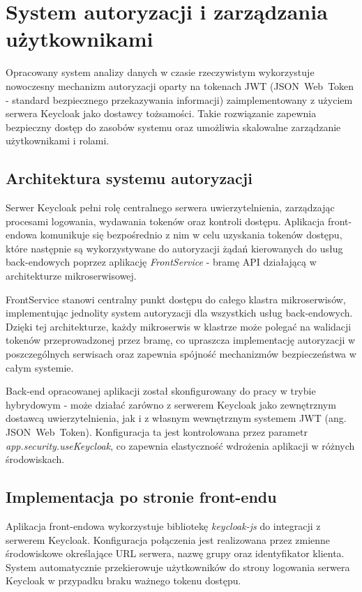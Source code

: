 \section{System autoryzacji i zarządzania użytkownikami}
\label{chap:autoryzacja}

Opracowany system analizy danych w czasie rzeczywistym wykorzystuje nowoczesny mechanizm autoryzacji oparty na tokenach \mbox{JWT} (\mbox{JSON Web Token} - standard bezpiecznego przekazywania informacji) zaimplementowany z użyciem serwera Keycloak jako dostawcy tożsamości. Takie rozwiązanie zapewnia bezpieczny dostęp do zasobów systemu oraz umożliwia skalowalne zarządzanie użytkownikami i rolami.

\subsection{Architektura systemu autoryzacji}

Serwer Keycloak pełni rolę centralnego serwera uwierzytelnienia, zarządzając procesami logowania, wydawania tokenów oraz kontroli dostępu. Aplikacja front-endowa komunikuje się bezpośrednio z nim w celu uzyskania tokenów dostępu, które następnie są wykorzystywane do autoryzacji żądań kierowanych do usług back-endowych poprzez aplikację \textit{FrontService} - bramę API działającą w architekturze mikroserwisowej.

FrontService stanowi centralny punkt dostępu do całego klastra mikroserwisów, implementując jednolity system autoryzacji dla wszystkich usług back-endowych. Dzięki tej architekturze, każdy mikroserwis w klastrze może polegać na walidacji tokenów przeprowadzonej przez bramę, co upraszcza implementację autoryzacji w poszczególnych serwisach oraz zapewnia spójność mechanizmów bezpieczeństwa w całym systemie.

Back-end opracowanej aplikacji został skonfigurowany do pracy w trybie hybrydowym - może działać zarówno z serwerem Keycloak jako zewnętrznym dostawcą uwierzytelnienia, jak i z własnym wewnętrznym systemem \mbox{JWT} (ang. \mbox{JSON Web Token}). Konfiguracja ta jest kontrolowana przez parametr \textit{app.security.useKeycloak}, co zapewnia elastyczność wdrożenia aplikacji w różnych środowiskach.

\subsection{Implementacja po stronie front-endu}

Aplikacja front-endowa wykorzystuje bibliotekę \textit{keycloak-js} do integracji z serwerem Keycloak. Konfiguracja połączenia jest realizowana przez zmienne środowiskowe określające URL serwera, nazwę grupy oraz identyfikator klienta. System automatycznie przekierowuje użytkowników do strony logowania serwera Keycloak w przypadku braku ważnego tokenu dostępu.

